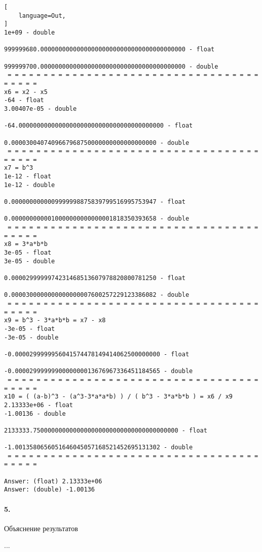 \begin{lstlisting}[
    language=Out,
]
1e+09 - double
                              999999680.0000000000000000000000000000000000000000 - float
                              999999700.0000000000000000000000000000000000000000 - double
 = = = = = = = = = = = = = = = = = = = = = = = = = = = = = = = = = = = = = = = =
x6 = x2 - x5
-64 - float
3.00407e-05 - double
                                    -64.0000000000000000000000000000000000000000 - float
                                      0.0000300407409667968750000000000000000000 - double
 = = = = = = = = = = = = = = = = = = = = = = = = = = = = = = = = = = = = = = = =
x7 = b^3
1e-12 - float
1e-12 - double
                                      0.0000000000009999998875839799516995753947 - float
                                      0.0000000000010000000000000001818350393658 - double
 = = = = = = = = = = = = = = = = = = = = = = = = = = = = = = = = = = = = = = = =
x8 = 3*a*b*b
3e-05 - float
3e-05 - double
                                      0.0000299999974231468513607978820800781250 - float
                                      0.0000300000000000000007600257229123386082 - double
 = = = = = = = = = = = = = = = = = = = = = = = = = = = = = = = = = = = = = = = =
x9 = b^3 - 3*a*b*b = x7 - x8
-3e-05 - float
-3e-05 - double
                                     -0.0000299999956041574478149414062500000000 - float
                                     -0.0000299999990000000013676967336451184565 - double
 = = = = = = = = = = = = = = = = = = = = = = = = = = = = = = = = = = = = = = = =
x10 = ( (a-b)^3 - (a^3-3*a*a*b) ) / ( b^3 - 3*a*b*b ) = x6 / x9
2.13333e+06 - float
-1.00136 - double
                                2133333.7500000000000000000000000000000000000000 - float
                                     -1.0013580656051646045057168521452695131302 - double
 = = = = = = = = = = = = = = = = = = = = = = = = = = = = = = = = = = = = = = = =

Answer: (float) 2.13333e+06
Answer: (double) -1.00136
\end{lstlisting}

\paragraph{5.} Объяснение результатов

...